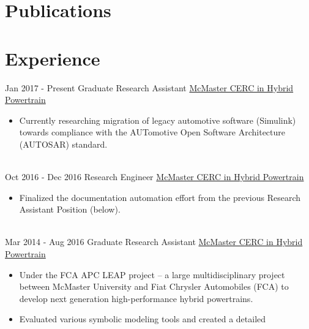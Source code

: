 \documentclass[letterpaper]{twentysecondcv} %
\begin{document}
\section{Publications}
 \vspace{2mm}
 \printbibliography[heading=none,type=article]
 



\section{Experience}

\begin{twenty} %
\twentyitem
  {Jan 2017 -}
  {Present}
  {Graduate Research Assistant}
  {%
  \href{http://hybrid.mcmaster.ca/}{McMaster CERC in Hybrid Powertrain}}
  {}
  {\begin{itemize}
    \item Currently researching migration of legacy automotive software
    (Simulink) towards compliance with the AUTomotive Open Software 
    Architecture (AUTOSAR) standard.
  \end{itemize}}
  \\
\twentyitem
  {Oct 2016 -}
  {Dec 2016}
  {Research Engineer}
  {\href{http://hybrid.mcmaster.ca/}{McMaster CERC in Hybrid Powertrain}}
  {}
  {\begin{itemize}
    \item Finalized the documentation automation effort from the previous
    Research Assistant Position (below).
  \end{itemize}}
  \\
\twentyitem
  {Mar 2014 -}
  {Aug 2016}
  {Graduate Research Assistant}
  {\href{http://hybrid.mcmaster.ca/}{McMaster CERC in Hybrid Powertrain}}
  {}
  {\begin{itemize}
    \item Under the FCA APC LEAP project -- a large multidisciplinary project
    between McMaster University and Fiat Chrysler Automobiles (FCA) to develop
    next generation high-performance hybrid powertrains.
    \item Evaluated various symbolic modeling tools and created a detailed

\end{itemize}}
\end{twenty}
\end{document}
